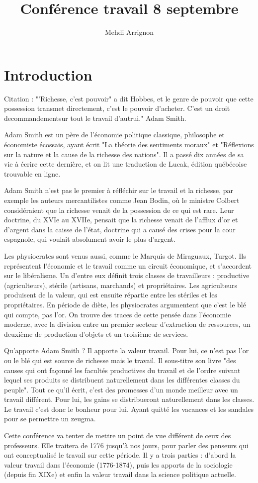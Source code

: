 \documentclass[a4paper,12pt]{book}
\title{Conférence travail 8 septembre}
\author{Mehdi Arrignon}
\begin{document}
\section{Introduction}
Citation : "'Richesse, c'est pouvoir" a dit Hobbes, et le genre de pouvoir que cette possession transmet directement, c'est le pouvoir d'acheter. C'est un droit decommandementsur tout le travail d'autrui." Adam Smith.
\par Adam Smith est un père de l'économie politique classique, philosophe et économiste écossais, ayant écrit "La théorie des sentiments moraux" et "Réflexions sur la nature et la cause de la richesse des nations". Il a passé dix années de sa vie à écrire cette dernière, et on lit une traduction de Lucak, édition québécoise trouvable en ligne.
\par Adam Smith n'est pas le premier à réfléchir sur le travail et la richesse, par exemple les auteurs mercantilistes comme Jean Bodin, où le ministre Colbert considéraient que la richesse venait de la possession de ce qui est rare. Leur doctrine, du XVIe au XVIIe, pensait que la richesse venait de l'afflux d'or et d'argent dans la caisse de l'état, doctrine qui a causé des crises pour la cour espagnole, qui voulait absolument avoir le plus d'argent.
\par Les physiocrates sont venus aussi, comme le Marquis de Miraguaux, Turgot. Ils représentent l'économie et le travail comme un circuit économique, et s'accordent sur le libéralisme. Un d'entre eux définit trois classes de travailleurs : productive (agriculteurs), stérile (artisans, marchands) et propriétaires. Les agriculteurs produisent de la valeur, qui est ensuite répartie entre les stériles et les propriétaires. En période de diète, les physiocrates argumentent que c'est le blé qui compte, pas l'or. On trouve des traces de cette pensée dans l'économie moderne, avec la division entre un premier secteur d'extraction de ressources, un deuxième de production d'objets et un troisième de services.
\par Qu'apporte Adam Smith ? Il apporte la valeur travail. Pour lui, ce n'est pas l'or ou le blé qui est source de richesse mais le travail. Il sous-titre son livre "des causes qui ont façonné les facultés productives du travail et de l'ordre suivant lequel ses produits se distribuent naturellement dans les différentes classes du peuple". Tout ce qu'il écrit, c'est des promesses d'un monde meilleur avec un travail différent. Pour lui, les gains se distribueront naturellement dans les classes. Le travail c'est donc le bonheur pour lui. Ayant quitté les vacances et les sandales pour se permettre un zeugma.
\par Cette conférence va tenter de mettre un point de vue différent de ceux des professeurs. Elle traitera de 1776 jusqu'à nos jours, pour parler des penseurs qui ont conceptualisé le travail sur cette période. Il y a trois parties : d'abord la valeur travail dans l'économie (1776-1874), puis les apports de la sociologie (depuis fin XIXe) et enfin la valeur travail dans la science politique actuelle.
\end{document}
